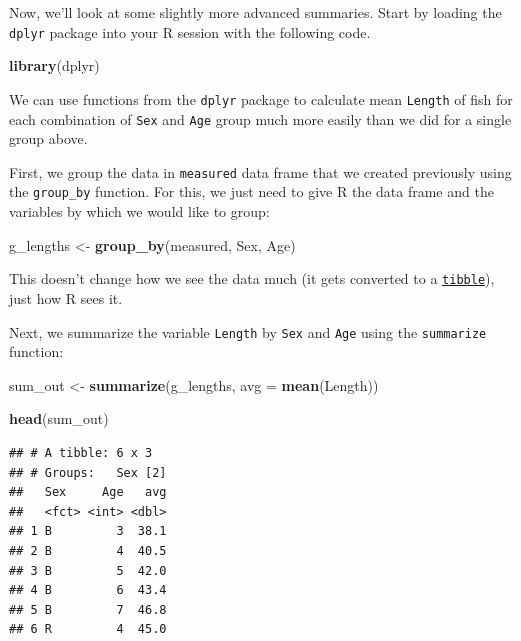 \documentclass[
]{book}
\newenvironment{Shaded}{\begin{snugshade}}{\end{snugshade}}
\newcommand{\DataTypeTok}[1]{\textcolor[rgb]{0.13,0.29,0.53}{#1}}
\newcommand{\KeywordTok}[1]{\textcolor[rgb]{0.13,0.29,0.53}{\textbf{#1}}}
\newcommand{\NormalTok}[1]{#1}
\newcommand{\StringTok}[1]{\textcolor[rgb]{0.31,0.60,0.02}{#1}}
\begin{document}
Now, we'll look at some slightly more advanced summaries. Start by loading the \texttt{dplyr} package into your R session with the following code.

\begin{Shaded}
\begin{Highlighting}[]
\KeywordTok{library}\NormalTok{(dplyr)}
\end{Highlighting}
\end{Shaded}

We can use functions from the \texttt{dplyr} package to calculate mean \texttt{Length} of fish for each combination of \texttt{Sex} and \texttt{Age} group much more easily than we did for a single group above.

First, we group the data in \texttt{measured} data frame that we created previously using the \texttt{group\_by} function. For this, we just need to give R the data frame and the variables by which we would like to group:

\begin{Shaded}
\begin{Highlighting}[]
\NormalTok{g_lengths <-}\StringTok{ }\KeywordTok{group_by}\NormalTok{(measured, Sex, Age)}
\end{Highlighting}
\end{Shaded}

This doesn't change how we see the data much (it gets converted to a \href{https://tibble.tidyverse.org/\#:~:text=A\%20tibble\%2C\%20or\%20tbl_df\%20\%2C\%20is,modern\%20reimagining\%20of\%20the\%20data.\&text=Tibbles\%20are\%20data.,a\%20variable\%20does\%20not\%20exist}{\texttt{tibble}}), just how R sees it.

Next, we summarize the variable \texttt{Length} by \texttt{Sex} and \texttt{Age} using the \texttt{summarize} function:

\begin{Shaded}
\begin{Highlighting}[]
\NormalTok{sum_out <-}\StringTok{ }\KeywordTok{summarize}\NormalTok{(g_lengths, }\DataTypeTok{avg =} \KeywordTok{mean}\NormalTok{(Length))}

\KeywordTok{head}\NormalTok{(sum_out)}
\end{Highlighting}
\end{Shaded}

\begin{verbatim}
## # A tibble: 6 x 3
## # Groups:   Sex [2]
##   Sex     Age   avg
##   <fct> <int> <dbl>
## 1 B         3  38.1
## 2 B         4  40.5
## 3 B         5  42.0
## 4 B         6  43.4
## 5 B         7  46.8
## 6 R         4  45.0
\end{verbatim}
\end{document}
